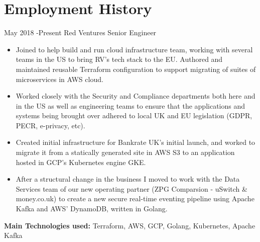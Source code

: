 \documentclass[10pt]{article} %
\begin{document}
\section{Employment History}

\jobheader
{May 2018 -}{Present}
{Red Ventures}
{Senior Engineer}
\vspace{-1cm}
  \begin{itemize}

  \item Joined to help build and run cloud infrastructure team, working
        with several teams in the US to bring RV's tech stack to the EU. Authored
        and maintained reusable Terraform configuration to support migrating of
        suites of microservices in AWS cloud.

  \item Worked closely with the Security and Compliance departments both here and
        in the US as well as engineering teams to ensure that the applications and
        systems being brought over adhered to local UK and EU legislation
        (GDPR, PECR, e-privacy, etc).

  \item Created initial infrastructure for Bankrate UK's initial launch, and worked
        to migrate it from a statically generated site in AWS S3 to an application hosted
        in GCP's Kubernetes engine GKE.

  \item After a structural change in the business I moved to work with the Data
        Services team of our new operating partner
        (ZPG Comparsion - uSwitch \& money.co.uk)
        to create a new secure real-time eventing pipeline using Apache Kafka
        and AWS' DynamoDB, written in Golang.

  \end{itemize}

  \textbf{Main Technologies used:}
  Terraform, AWS, GCP, Golang, Kubernetes, Apache Kafka
\end{document}
